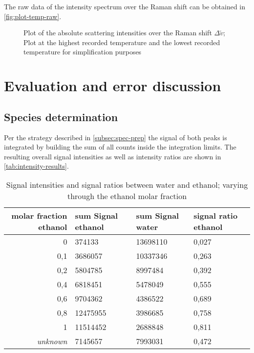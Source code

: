 The raw data of the intensity spectrum over the Raman shift can be obtained in \autoref{fig:plot-temp-raw}. 

\begin{figure}[!htb]
    \centering
    
    \caption[Absolute Raman shift intensities for the lowest and highest temperatures]{Plot of the absolute scattering intensities over the Raman shift $\Delta \tilde{v}$; Plot at the highest recorded temperature and the lowest recorded temperature for simplification purposes}
    \label{fig:plot-temp-raw}
\end{figure}

\section{Evaluation and error discussion}
\label{sec:eval}

\subsection{Species determination}
\label{subsec:spec-eval}

Per the strategy described in \autoref{subsec:spec-prep} the signal of both peaks is integrated by building the sum of all counts inside the integration limits. The resulting overall signal intensities as well as intensity ratios are shown in \autoref{tab:intensity-results}.

\begin{table}[!htb]
    \centering
    \small
    \caption[Signal intensities and signal ratios between water and ethanol]{Signal intensities and signal ratios between water and ethanol; varying through the ethanol molar fraction}
    \label{tab:intensity-results}
    \vspace{12pt}
    \begin{tabular}{|r|l|l|l|}
        \hline
        \rowcolor{lightgray} molar fraction ethanol & sum Signal ethanol & sum Signal water & signal ratio ethanol \\ \hline \hline
        0	    & 374133	& 13698110  & 0,027 \\ \hline
        0,1	    & 3686057	& 10337346  & 0,263 \\ \hline
        0,2	    & 5804785	& 8997484	& 0,392 \\ \hline
        0,4	    & 6818451	& 5478049	& 0,555 \\ \hline
        0,6	    & 9704362	& 4386522	& 0,689 \\ \hline
        0,8	    & 12475955	& 3986685	& 0,758 \\ \hline
        1	    & 11514452	& 2688848	& 0,811 \\ \hline
        \itshape{unknown}	& 7145657	& 7993031	& 0,472 \\ \hline
    \end{tabular}
\end{table}

